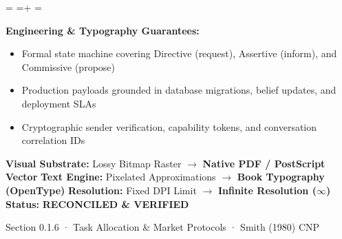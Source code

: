\documentclass[10pt,a4paper,landscape]{article}
\newcommand{\pdautoscale}[2]{%
  \pdmaxh=#1\relax
  \pdmaxw=#2\relax
  \sbox{\pdscaledbox}{\usebox{\pdfigbox}}%
  \pdcurh=\dimexpr\ht\pdscaledbox+\dp\pdscaledbox\relax
  \pdcurw=\wd\pdscaledbox
  \ifdim\dimexpr\pdcurw * 100 / \pdmaxw\relax > \dimexpr\pdcurh * 100 / \pdmaxh\relax
    \resizebox{\pdmaxw}{!}{\usebox{\pdscaledbox}}%
  \else
    \resizebox{!}{\pdmaxh}{\usebox{\pdscaledbox}}%
  \fi
}
\begin{document}
\begin{minipage}[t]{0.492\linewidth}
  \begin{tcolorbox}[
    colback=pdcobalt!3,colframe=pdcobalt!85!black,arc=1.5pt,
    boxrule=0.7pt,top=1.5pt,bottom=1.5pt,left=4pt,right=4pt,
    title={\pdgrotesk\footnotesize\bfseries \color{white} B. Authoritative Native Vector Replacement \hfill \texttt{.tex / TikZ / PGF}}
  ]
    \begin{minipage}[c][8.3cm][c]{\linewidth}
      \centering
      \sbox{\pdfigbox}{}
      \pdautoscale{8.0cm}{\linewidth}
    \end{minipage}
    \tcblower
    \begin{minipage}[t][2.0cm][t]{\linewidth}
      \pdgrotesk\scriptsize
      \textbf{{\color{pdcobalt} Engineering \& Typography Guarantees:}}\\
      \begin{itemize}[leftmargin=9pt,itemsep=0pt,topsep=0.5pt,parsep=0pt]
        \item Formal state machine covering Directive (request), Assertive (inform), and Commissive (propose)
        \item Production payloads grounded in database migrations, belief updates, and deployment SLAs
        \item Cryptographic sender verification, capability tokens, and conversation correlation IDs
      \end{itemize}
    \end{minipage}
  \end{tcolorbox}
\end{minipage}

\vspace*{0.05cm}
\noindent
\begin{tcolorbox}[
  colback=hhpaper,colframe=hhgray!35,arc=1.5pt,boxrule=0.4pt,
  top=1.5pt,bottom=1.5pt,left=6pt,right=6pt
]
  \pdgrotesk\scriptsize
  \noindent
  \textbf{Visual Substrate:} Lossy Bitmap Raster $\rightarrow$ \textbf{\color{pdcobalt}Native PDF / PostScript Vector}\hfill
  \textbf{Text Engine:} Pixelated Approximations $\rightarrow$ \textbf{\color{pdcobalt}Book Typography (OpenType)}\hfill
  \textbf{Resolution:} Fixed DPI Limit $\rightarrow$ \textbf{\color{pdcobalt}Infinite Resolution ($\infty$)}\hfill
  \textbf{Status:} \textbf{\color{pdteal}RECONCILED \& VERIFIED}
\end{tcolorbox}
\clearpage

\noindent
\begin{minipage}[t]{\linewidth}
  \hfill
  {\pdgrotesk\footnotesize\color{hhgray} Section 0.1.6 · Task Allocation \& Market Protocols · Smith (1980) CNP}\\
  \vspace*{0.03cm}
  \noindent{\color{hhgray!40}\rule{\linewidth}{0.5pt}}
\end{minipage}
\end{document}
